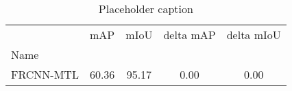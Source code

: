 \begin{table}[htbp]
\centering
\caption{Placeholder caption}
\label{tab:dwa-const-grad}
\begin{tabular}{lcccc}
\toprule
 & mAP & mIoU & delta mAP & delta mIoU \\
Name &  &  &  &  \\
\midrule
FRCNN-MTL & 60.36 & 95.17 & 0.00 & 0.00 \\
\bottomrule
\end{tabular}
\end{table}
